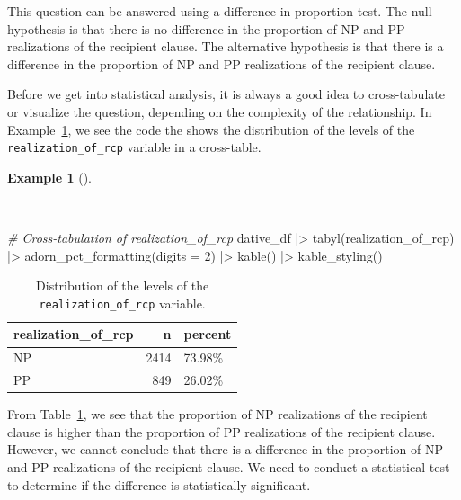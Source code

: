 \documentclass[
  letterpaper,
  DIV=11,
  numbers=noendperiod]{scrreprt}
\newenvironment{Shaded}{\begin{snugshade}}{\end{snugshade}}
\newcommand{\AttributeTok}[1]{\textcolor[rgb]{0.00,0.00,0.00}{#1}}
\newcommand{\CommentTok}[1]{\textcolor[rgb]{0.00,0.00,0.00}{\textit{#1}}}
\newcommand{\DecValTok}[1]{\textcolor[rgb]{0.00,0.00,0.00}{#1}}
\newcommand{\FunctionTok}[1]{\textcolor[rgb]{0.00,0.00,0.00}{#1}}
\newcommand{\NormalTok}[1]{\textcolor[rgb]{0.00,0.00,0.00}{#1}}
\newcommand{\SpecialCharTok}[1]{\textcolor[rgb]{0.00,0.00,0.00}{#1}}
\theoremstyle{definition}
\newtheorem{example}{Example}[chapter]
\theoremstyle{remark}
\begin{document}
This question can be answered using a difference in proportion test. The
null hypothesis is that there is no difference in the proportion of NP
and PP realizations of the recipient clause. The alternative hypothesis
is that there is a difference in the proportion of NP and PP
realizations of the recipient clause.

Before we get into statistical analysis, it is always a good idea to
cross-tabulate or visualize the question, depending on the complexity of
the relationship. In Example~\ref{exm-ida-cat-univariate-tbl}, we see
the code the shows the distribution of the levels of the
\texttt{realization\_of\_rcp} variable in a cross-table.

\begin{example}[]\protect\hypertarget{exm-ida-cat-univariate-tbl}{}\label{exm-ida-cat-univariate-tbl}

~

\begin{Shaded}
\begin{Highlighting}[]
\CommentTok{\# Cross{-}tabulation of \textasciigrave{}realization\_of\_rcp\textasciigrave{}}
\NormalTok{dative\_df }\SpecialCharTok{|\textgreater{}}
  \FunctionTok{tabyl}\NormalTok{(realization\_of\_rcp) }\SpecialCharTok{|\textgreater{}}
  \FunctionTok{adorn\_pct\_formatting}\NormalTok{(}\AttributeTok{digits =} \DecValTok{2}\NormalTok{) }\SpecialCharTok{|\textgreater{}}
  \FunctionTok{kable}\NormalTok{() }\SpecialCharTok{|\textgreater{}}
  \FunctionTok{kable\_styling}\NormalTok{()}
\end{Highlighting}
\end{Shaded}

\begin{longtable}[t]{lrl}

\caption{\label{tbl-ida-cat-univariate}Distribution of the levels of the
\texttt{realization\_of\_rcp} variable.}

\tabularnewline

\toprule
realization\_of\_rcp & n & percent\\
\midrule
NP & 2414 & 73.98\%\\
PP & 849 & 26.02\%\\
\bottomrule

\end{longtable}

\end{example}

From Table~\ref{tbl-ida-cat-univariate}, we see that the proportion of
NP realizations of the recipient clause is higher than the proportion of
PP realizations of the recipient clause. However, we cannot conclude
that there is a difference in the proportion of NP and PP realizations
of the recipient clause. We need to conduct a statistical test to
determine if the difference is statistically significant.
\end{document}
